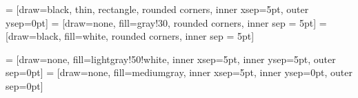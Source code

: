 \renewcommand*{\chapter}{\oldchap}

\let\oldchapa=\chapter
\renewcommand*{\chapter}{%
    \secdef{\Chap}{\ChapS}%
}
\renewcommand*\ChapS[1]{\oldchapa*{#1}}%
\renewcommand*\Chap[2][]{\oldchapa[\texorpdfstring{{#1}}{#1}]{#2}}%
    


\makeatother


\newcommand{\q}{{\ensuremath{\mathbf{q}}}}

\newcommand{\SF}{SF}
\newcommand{\OI}{OI}
\newcommand{\SD}{\SF{}PULSES}
\newcommand{\DO}{\SF{}DIRS}
\newcommand{\FD}{\SF{}}

\newcommand{\SFshort}{\SF$_{90}$}
\newcommand{\SFlong}{\SF$_{360}$}
\newcommand{\OIlong}{\OI$_{360}$}

\newcommand{\FDmod}{\FD{\ensuremath{_{mod}}}}
\newcommand{\SFasym}{A\SF{}}

 = [draw=black, thin, rectangle, rounded corners, inner xsep=5pt, outer ysep=0pt]  = [draw=none, fill=gray!30, rounded corners, inner sep = 5pt]  = [draw=black, fill=white, rounded corners, inner sep = 5pt]



\setlength{\abovecaptionskip}{4pt} %
\setlength{\belowcaptionskip}{4pt} %
 = [draw=none, fill=lightgray!50!white, inner xsep=5pt, inner ysep=5pt, outer sep=0pt]
 = [draw=none, fill=mediumgray, inner xsep=5pt, inner ysep=0pt, outer sep=0pt]


\usepackage{stringstrings}
\DeclareRobustCommand*\MakeTitlecase[1]{%
  \caselower[e]{#1}%
  \capitalizetitle{\thestring}%
}

\makeatletter
